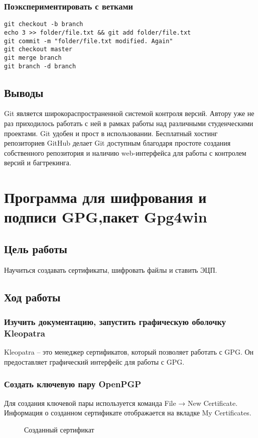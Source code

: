 \documentclass[10pt,a4paper]{article}
\begin{document}
\subsubsection{Поэкспериментировать с ветками}
\begin{verbatim}
git checkout -b branch
echo 3 >> folder/file.txt && git add folder/file.txt
git commit -m "folder/file.txt modified. Again"
git checkout master
git merge branch
git branch -d branch
\end{verbatim}
\subsection{Выводы}

Git является широкораспространенной системой контроля версий. Автору уже не раз приходилось работать с ней в рамках работы над различными студенческими проектами. Git удобен и прост в использовании. Бесплатный хостинг репозиториев GitHub делает Git доступным благодаря простоте создания собственного репозитория и наличию web-интерфейса для работы с контролем версий и багтрекинга.


\section{Программа для шифрования и подписи GPG,пакет Gpg4win}
\subsection{Цель работы}
Научиться создавать сертификаты, шифровать файлы и ставить ЭЦП.
\subsection{Ход работы}
\subsubsection{ Изучить документацию, запустить графическую оболочку Kleopatra}
Kleopatra -- это менеджер сертификатов, который позволяет работать с GPG. Он предоставляет графический интерфейс для работы с GPG.
\subsubsection{Создать ключевую пару OpenPGP}
Для создания ключевой пары используется команда File → New Certificate. Информация о созданном сертификате отображается на вкладке My Certificates.
\begin{figure}[h!]
\centering

\caption{Созданный сертификат}
\end{figure}
\end{document}
